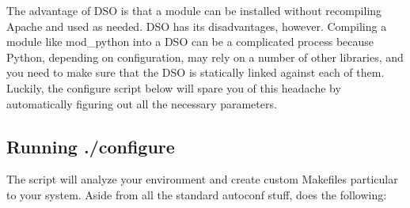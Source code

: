 The advantage of DSO is that a module can be installed without
recompiling Apache and used as needed. DSO has its disadvantages,
however. Compiling a module like mod_python into a DSO can be a
complicated process because Python, depending on configuration, may
rely on a number of other libraries, and you need to make sure that
the DSO is statically linked against each of them. Luckily, the
configure script below will spare you of this headache by
automatically figuring out all the necessary parameters.

\subsection{Running ./configure\label{inst-configure}}

The  script will analyze your environment and create custom
Makefiles particular to your system. Aside from all the standard
autoconf stuff,  does the following:

